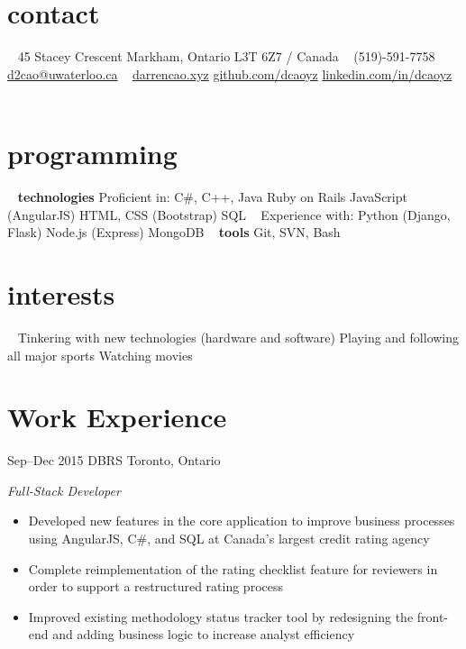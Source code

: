 \documentclass[print]{friggeri-cv} %
\begin{document}


\begin{aside}
\section{contact}
~
45 Stacey Crescent
Markham, Ontario
L3T 6Z7 / Canada
~
(519)-591-7758
\href{mailto:d2cao@uwaterloo.ca}{d2cao@uwaterloo.ca}
~
\href{http://darrencao.xyz}{darrencao.xyz}
\href{https://github.com/dcaoyz}{github.com/dcaoyz}
\href{https://ca.linkedin.com/in/dcaoyz}{linkedin.com/in/dcaoyz}
~
\section{programming}
~
{\textbf{technologies}
Proficient in:
C\#, C++, Java
Ruby on Rails
JavaScript (AngularJS)
HTML, CSS (Bootstrap)
SQL}
~
Experience with:
Python (Django, Flask)
Node.js (Express)
MongoDB
~
\textbf{tools}
Git, SVN, Bash
~
\section{interests}
~
Tinkering with new technologies (hardware and software)
Playing and following all major sports
Watching movies
\end{aside}


\section{Work Experience}


\begin{entrylist}
\entry
{Sep--Dec 2015}
{DBRS}
{Toronto, Ontario}
{\emph{Full-Stack Developer}
\begin{itemize}
\item Developed new features in the core application to improve business processes using AngularJS, C\#, and SQL at Canada's largest credit rating agency
\item Complete reimplementation of the rating checklist feature for reviewers in order to support a restructured rating process
\item Improved existing methodology status tracker tool by redesigning the front-end and adding business logic to increase analyst efficiency
\end{itemize}}
\end{entrylist}
\end{document}
